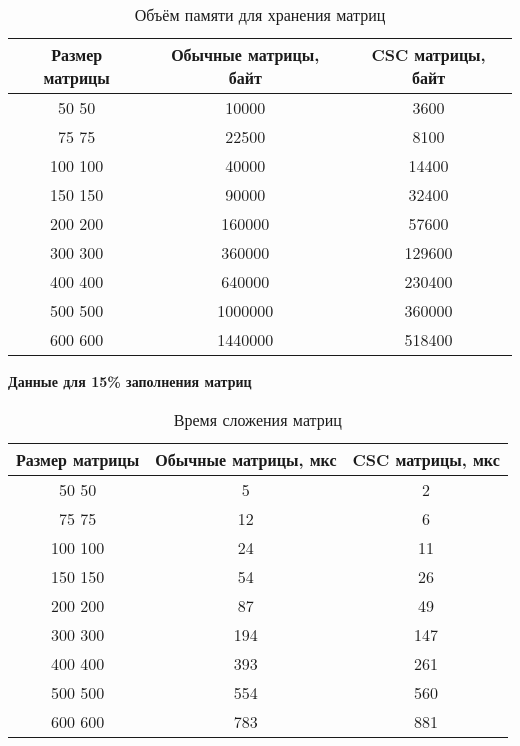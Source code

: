 \begin{table}[H]
	\centering
	\caption{Объём памяти для хранения матриц}
	\begin{tabular}{|c|c|c|}
		\hline
		Размер матрицы & Обычные матрицы, байт & CSC матрицы, байт \\ \hline
		50  50         & 10000                 & 3600               \\ \hline
		75  75         & 22500                 & 8100             \\ \hline
		100 100        & 40000                 & 14400             \\ \hline
		150 150        & 90000                 & 32400             \\ \hline
		200 200        & 160000                & 57600            \\ \hline
		300 300        & 360000                & 129600            \\ \hline
		400 400        & 640000                & 230400            \\ \hline
		500 500        & 1000000               & 360000            \\ \hline
		600 600        & 1440000               & 518400           \\ \hline
	\end{tabular}
\end{table}


\newpage
\textbf{Данные для 15\% заполнения матриц}
\begin{table}[H]
	\centering
	\caption{Время сложения матриц}
	\begin{tabular}{|c|c|c|}
		\hline
		Размер матрицы & Обычные матрицы, мкс & CSC матрицы, мкс \\ \hline
		50  50         & 5                    & 2                \\ \hline
		75  75         & 12                   & 6                \\ \hline
		100 100        & 24                   & 11                \\ \hline
		150 150        & 54                   & 26               \\ \hline
		200 200        & 87                   & 49               \\ \hline
		300 300        & 194                  & 147               \\ \hline
		400 400        & 393                  & 261               \\ \hline
		500 500        & 554                  & 560              \\ \hline
		600 600        & 783                  & 881              \\ \hline
	\end{tabular}
\end{table}


